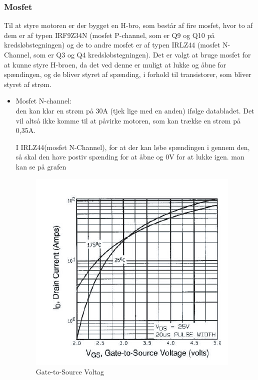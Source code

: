 \subsubsection{Mosfet}
Til at styre motoren er der bygget en H-bro, som består af fire mosfet, hvor to af dem er af typen IRF9Z34N (mosfet P-channel, som er Q9 og Q10 på kredsløbstegningen) og de to andre mosfet er af typen IRLZ44 (mosfet N-Channel, som er Q3 og Q4 kredsløbstegningen). Det er valgt at bruge mosfet for at kunne styre H-broen, da det ved denne er muligt at lukke og åbne for spændingen, og de bliver styret af spænding, i forhold til transistorer, som bliver styret af strøm. 

\begin{itemize}
	\item Mosfet N-channel:\\
	den kan klar en strøm på 30A (tjek lige med en anden) ifølge databladet. Det vil altså ikke
	komme til at påvirke motoren, som kan trække en strøm på 0,35A.
	
	I IRLZ44(mosfet N-Channel), for at der kan løbe spændingen i gennem 
	den, så skal den have postiv spænding for at åbne og 0V for at lukke igen. 
	man kan se på grafen 
	
	\begin{figure}[H]
		\centering
		\includegraphics[width=\textwidth]{DesignOgImplementering/images/grafn}
		\caption{Gate-to-Source Voltag}
	\end{figure}
	

\end{itemize}
